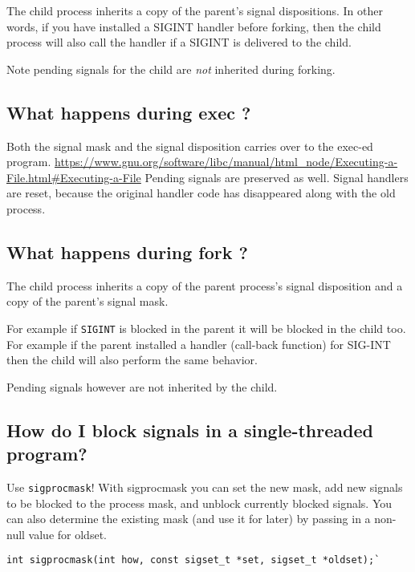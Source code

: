 The child process inherits a copy of the parent's signal dispositions.
In other words, if you have installed a SIGINT handler before forking,
then the child process will also call the handler if a SIGINT is
delivered to the child.

Note pending signals for the child are \emph{not} inherited during
forking.

\subsection{What happens during exec ?}\label{what-happens-during-exec}

Both the signal mask and the signal disposition carries over to the
exec-ed program.
\href{Source}{https://www.gnu.org/software/libc/manual/html\_node/Executing-a-File.html\#Executing-a-File}
Pending signals are preserved as well. Signal handlers are reset,
because the original handler code has disappeared along with the old
process.

\subsection{What happens during fork ?}\label{what-happens-during-fork}

The child process inherits a copy of the parent process's signal
disposition and a copy of the parent's signal mask.

For example if \texttt{SIGINT} is blocked in the parent it will be
blocked in the child too. For example if the parent installed a handler
(call-back function) for SIG-INT then the child will also perform the
same behavior.

Pending signals however are not inherited by the child.

\subsection{How do I block signals in a single-threaded
program?}\label{how-do-i-block-signals-in-a-single-threaded-program}

Use \texttt{sigprocmask}! With sigprocmask you can set the new mask, add
new signals to be blocked to the process mask, and unblock currently
blocked signals. You can also determine the existing mask (and use it
for later) by passing in a non-null value for oldset.

\begin{verbatim}
int sigprocmask(int how, const sigset_t *set, sigset_t *oldset);`
\end{verbatim}

